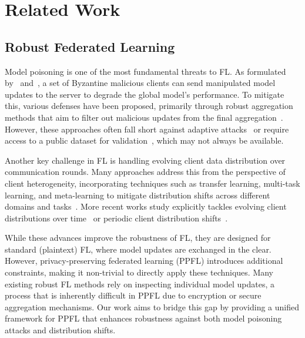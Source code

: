 \section{Related Work}
\label{sec:related}


\subsection{Robust Federated Learning}

 Model poisoning is one of the most fundamental threats to FL. As formulated by~\citet{blanchard2017byzantine} and~\citet{yin2018trimmedmean}, a set of Byzantine malicious clients can send manipulated model updates to the server to degrade the global model's performance.
To mitigate this, various defenses have been proposed, primarily through robust aggregation methods that aim to filter out malicious updates from the final aggregation~\cite{sun2019normbound, steinhardt2017normball, yin2018trimmedmean, blanchard2017krum, cao2020fltrust}.
However, these approaches often fall short against adaptive attacks~\cite{fang2020local,SP:LBVKH23} or require access to a public dataset for validation~\cite{cao2020fltrust}, which may not always be available.


Another key challenge in FL is handling evolving client data distribution over communication rounds. 
Many approaches address this from the perspective of client heterogeneity, incorporating techniques such as transfer learning, multi-task learning, and meta-learning to mitigate distribution shifts across different domains and tasks~\cite{smith2017federated, khodak2019adaptive}.
More recent works study explicitly tackles evolving client distributions over time~\cite{yoon2021federated} or periodic client distribution shifts~\cite{periodicshift}.


While these advances improve the robustness of FL, they are designed for standard (plaintext) FL, where model updates are exchanged in the clear. 
However, privacy-preserving federated learning (PPFL) introduces additional constraints, making it non-trivial to directly apply these techniques. 
Many existing robust FL methods rely on inspecting individual model updates, a process that is inherently difficult in PPFL due to encryption or secure aggregation mechanisms. 
Our work aims to bridge this gap by providing a unified framework for PPFL that enhances robustness against both model poisoning attacks and distribution shifts.




